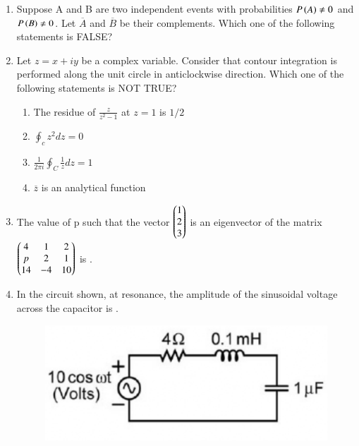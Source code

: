 \documentclass[a4paper, 11pt]{article}
\begin{document}
\begin{enumerate}
    \hfill{}

    \item Suppose A and B are two independent events with probabilities $P\left(A\right)\ne0$ and $P\left(B\right)\ne0$. Let $\overline{A}$ and $\overline{B}$ be their complements. Which one of the following statements is FALSE?
    \begin{enumerate}
    \end{enumerate}
    
    \hfill{}

    \item Let $z=x+iy$ be a complex variable. Consider that contour integration is performed along the unit circle in anticlockwise direction. Which one of the following statements is NOT TRUE?
    \begin{enumerate}
        \item The residue of $\frac{z}{z^{2}-1}$ at $z=1$ is $1/2$
        \item $\oint_{c}z^{2}dz=0$
        \item $\frac{1}{2\pi i}\oint_{C}\frac{1}{z}dz=1$
        \item $\overline{z}$  is an analytical function
    \end{enumerate}
    
    \hfill{}

    \item The value of p such that the vector $\begin{pmatrix}1\\ 2\\ 3\end{pmatrix}$ is an eigenvector of the matrix $\begin{pmatrix}4 & 1 & 2\\ p & 2 & 1\\ 14 & -4 & 10\end{pmatrix}$ is \underline{\hspace{2cm}}.

    \hfill{}

    \item In the circuit shown, at resonance, the amplitude of the sinusoidal voltage  across the capacitor is \underline{\hspace{2cm}}.
    \begin{figure}[H]
        \centering
        \includegraphics[width=0.4\columnwidth]{figs/q16.png}
        \caption*{}
        \label{fig:q16}
    \end{figure}
    

\end{enumerate}
\end{document}

